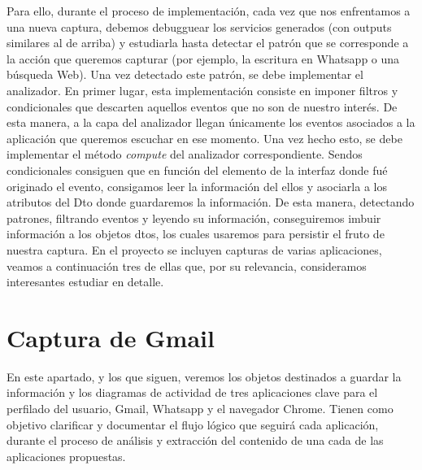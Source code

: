 \documentclass[12pt,a4paper,oneside]{book} %
\begin{document}
\newline \newline 
Para ello, durante el proceso de implementación, cada vez que nos enfrentamos a una nueva captura, debemos debugguear los servicios generados (con outputs similares al de arriba) y estudiarla hasta detectar el patrón que se corresponde a la acción que queremos capturar (por ejemplo, la escritura en Whatsapp o una búsqueda Web). 
\newline \newline 
Una vez detectado este patrón, se debe implementar el analizador. En primer lugar, esta implementación consiste en imponer filtros y condicionales que descarten aquellos eventos que no son de nuestro interés. De esta manera, a la capa del analizador llegan únicamente los eventos asociados a la aplicación que queremos escuchar en ese momento. 
\newline \newline
Una vez hecho esto, se debe implementar el método \textit{compute} del analizador correspondiente. Sendos condicionales consiguen que en función del elemento de la interfaz donde fué originado el evento, consigamos leer la información del ellos y asociarla a los atributos del Dto donde guardaremos la información. 
\newline \newline 
De esta manera, detectando patrones, filtrando eventos y leyendo su información, conseguiremos imbuir información a los objetos dtos, los cuales usaremos para persistir el fruto de nuestra captura. 
\newline \newline 
En el proyecto se incluyen capturas de varias aplicaciones, veamos a continuación tres de ellas que, por su relevancia, consideramos interesantes estudiar en detalle. 
\section{Captura de Gmail}
En este apartado, y los que siguen, veremos los objetos destinados a guardar la información y los diagramas de actividad de tres aplicaciones clave para el perfilado del usuario, Gmail, Whatsapp y el navegador Chrome. Tienen como objetivo clarificar y documentar el flujo lógico que seguirá cada aplicación, durante el proceso de análisis y extracción del contenido de una cada de las aplicaciones propuestas.
\end{document}
